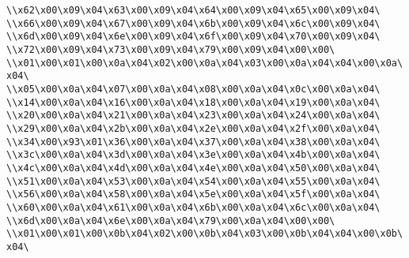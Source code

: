 \verb|\\x62\x00\x09\x04\x63\x00\x09\x04\x64\x00\x09\x04\x65\x00\x09\x04\|\newline
\verb|\\x66\x00\x09\x04\x67\x00\x09\x04\x6b\x00\x09\x04\x6c\x00\x09\x04\|\newline
\verb|\\x6d\x00\x09\x04\x6e\x00\x09\x04\x6f\x00\x09\x04\x70\x00\x09\x04\|\newline
\verb|\\x72\x00\x09\x04\x73\x00\x09\x04\x79\x00\x09\x04\x00\x00\|\newline
\verb|\\x01\x00\x01\x00\x0a\x04\x02\x00\x0a\x04\x03\x00\x0a\x04\x04\x00\x0a\x04\|\newline
\verb|\\x05\x00\x0a\x04\x07\x00\x0a\x04\x08\x00\x0a\x04\x0c\x00\x0a\x04\|\newline
\verb|\\x14\x00\x0a\x04\x16\x00\x0a\x04\x18\x00\x0a\x04\x19\x00\x0a\x04\|\newline
\verb|\\x20\x00\x0a\x04\x21\x00\x0a\x04\x23\x00\x0a\x04\x24\x00\x0a\x04\|\newline
\verb|\\x29\x00\x0a\x04\x2b\x00\x0a\x04\x2e\x00\x0a\x04\x2f\x00\x0a\x04\|\newline
\verb|\\x34\x00\x93\x01\x36\x00\x0a\x04\x37\x00\x0a\x04\x38\x00\x0a\x04\|\newline
\verb|\\x3c\x00\x0a\x04\x3d\x00\x0a\x04\x3e\x00\x0a\x04\x4b\x00\x0a\x04\|\newline
\verb|\\x4c\x00\x0a\x04\x4d\x00\x0a\x04\x4e\x00\x0a\x04\x50\x00\x0a\x04\|\newline
\verb|\\x51\x00\x0a\x04\x53\x00\x0a\x04\x54\x00\x0a\x04\x55\x00\x0a\x04\|\newline
\verb|\\x56\x00\x0a\x04\x58\x00\x0a\x04\x5e\x00\x0a\x04\x5f\x00\x0a\x04\|\newline
\verb|\\x60\x00\x0a\x04\x61\x00\x0a\x04\x6b\x00\x0a\x04\x6c\x00\x0a\x04\|\newline
\verb|\\x6d\x00\x0a\x04\x6e\x00\x0a\x04\x79\x00\x0a\x04\x00\x00\|\newline
\verb|\\x01\x00\x01\x00\x0b\x04\x02\x00\x0b\x04\x03\x00\x0b\x04\x04\x00\x0b\x04\|\newline

